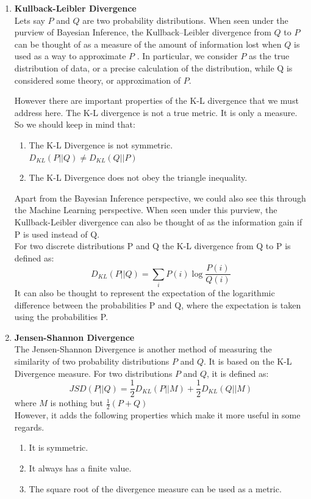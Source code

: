 \documentclass{article}
\begin{document}
\begin{enumerate}
\item \textbf{Kullback-Leibler Divergence}\\
Lets say $P$ and $Q$ are two probability distributions. When seen under the purview of Bayesian Inference, the Kullback–Leibler divergence from $Q$ to $P$ can be thought of as a measure of the amount of information lost when $Q$ is used as a way to approximate $P$ \cite{burnham_anderson_2010}. In particular, we consider $P$ as the true distribution of data, or a precise calculation of the distribution, while Q is considered some theory, or approximation of $P$.

However there are important properties of the K-L divergence that we must address here. The K-L divergence is not a true metric. It is only a measure. So we should keep in mind that:
	\begin{enumerate}
	\item The K-L Divergence is not symmetric. \\
    $D_{KL}(P||Q) \neq D_{KL}(Q||P)$
    
    \item The K-L Divergence does not obey the triangle inequality.
	\end{enumerate}

Apart from the Bayesian Inference perspective, we could also see this through the Machine Learning perspective. When seen under this purview, the Kullback-Leibler divergence can also be thought of as the information gain if P is used instead of Q. \\

For two discrete distributions P and Q the K-L divergence from Q to P is defined as:\\
\begin{equation*}
D_{KL} (P||Q) = \sum_{i} P(i) \log \frac{P(i)}{Q(i)}
\end{equation*}
It can also be thought to represent the expectation of the logarithmic difference between the probabilities P and Q, where the expectation is taken using the probabilities P.
\item \textbf{Jensen-Shannon Divergence} \\
The Jensen-Shannon Divergence is another method of measuring the similarity of two probability distributions $P$ and $Q$. It is based on the K-L Divergence measure. For two distributions $P$ and $Q$, it is defined as:
\begin{equation*}
	JSD(P||Q) = \frac{1}{2} D_{KL}(P||M) + \frac{1}{2} D_{KL}(Q||M)
\end{equation*}
where $M$ is nothing but $\frac{1}{2} (P + Q)$\\


However, it adds the following properties which make it more useful in some regards.
    \begin{enumerate}
    \item It is symmetric.
    \item It always has a finite value.
    \item The square root of the divergence measure can be used as a metric.
    \end{enumerate}
\end{enumerate}
\end{document}
